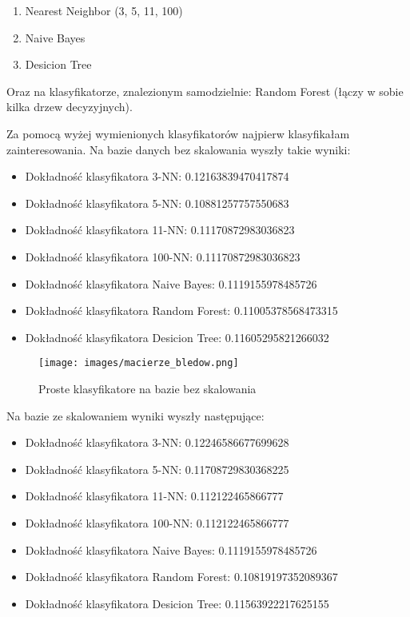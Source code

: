 \documentclass[12pt,a4paper]{article}
\begin{document}
\begin{enumerate}
    \item Nearest Neighbor (3, 5, 11, 100)
    \item Naive Bayes
    \item Desicion Tree
\end{enumerate}

Oraz na klasyfikatorze, znalezionym samodzielnie: Random Forest (łączy w sobie kilka drzew decyzyjnych).

Za pomocą wyżej wymienionych klasyfikatorów najpierw klasyfikałam zainteresowania. Na bazie danych bez skalowania wyszły takie wyniki:

\begin{itemize}
    \item Dokładność klasyfikatora 3-NN: 0.12163839470417874
    \item Dokładność klasyfikatora 5-NN: 0.10881257757550683
    \item Dokładność klasyfikatora 11-NN: 0.11170872983036823
    \item Dokładność klasyfikatora 100-NN: 0.11170872983036823
    \item Dokładność klasyfikatora Naive Bayes: 0.1119155978485726
    \item Dokładność klasyfikatora Random Forest: 0.11005378568473315
    \item Dokładność klasyfikatora Desicion Tree: 0.11605295821266032
\end{itemize}

\begin{figure}[h]
    \centering
    \texttt{[image: images/macierze\_bledow.png]}
    \caption{Proste klasyfikatore na bazie bez skalowania}
    \label{fig:pk}
\end{figure}

Na bazie ze skalowaniem wyniki wyszły następujące:

\begin{itemize}
    \item Dokładność klasyfikatora 3-NN: 0.12246586677699628
    \item Dokładność klasyfikatora 5-NN: 0.11708729830368225
    \item Dokładność klasyfikatora 11-NN: 0.112122465866777
    \item Dokładność klasyfikatora 100-NN: 0.112122465866777
    \item Dokładność klasyfikatora Naive Bayes: 0.1119155978485726
    \item Dokładność klasyfikatora Random Forest: 0.10819197352089367
    \item Dokładność klasyfikatora Desicion Tree: 0.11563922217625155
\end{itemize}
\end{document}
